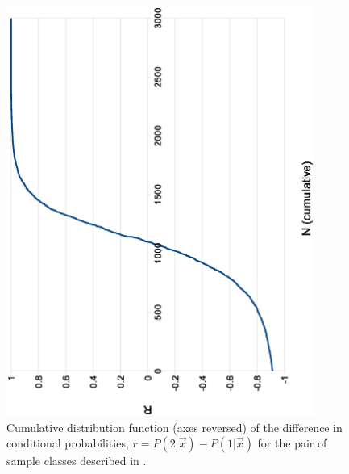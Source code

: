 \documentclass{article}
\begin{document}
\begin{figure}
\includegraphics[width=0.9\textwidth,angle=-90]{rhist.eps}
\caption{Cumulative distribution function (axes reversed) 
of the difference in conditional
probabilities, $r=P(2|\vec x)-P(1|\vec x)$
for the pair of sample classes described in \citet{Mills2011}.}
\label{rhist}
\end{figure}
\end{document}
